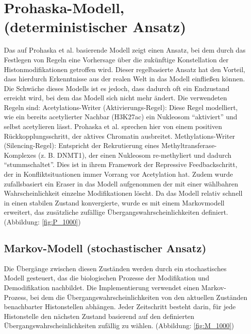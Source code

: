 \documentclass{SeminarV2}
\begin{document}
\section{Prohaska-Modell, (deterministischer Ansatz)}
Das auf Prohaska et al. basierende Modell zeigt einen Ansatz, bei dem durch das Festlegen
von Regeln eine Vorhersage über die zukünftige Konstellation der Histonmodifikationen getroffen wird.
Dieser regelbasierte Ansatz hat den Vorteil, dass hierdurch Erkenntnisse aus der realen Welt in das Modell einfließen können.
Die Schwäche dieses Modells ist es jedoch, dass dadurch oft ein Endzustand erreicht wird, bei dem das Modell sich nicht mehr ändert.
Die verwendeten Regeln sind:
Acetylations-Writer (Aktivierungs-Regel):
Diese Regel modelliert, wie ein bereits acetylierter Nachbar (H3K27ac) ein Nukleosom “aktiviert” und selbst acetylieren lässt. Prohaska et al. sprechen hier von einem positiven Rückkopplungsschritt, der aktives Chromatin ausbreitet.
Methylations-Writer (Silencing-Regel):
Entspricht der Rekrutierung eines Methyltransferase-Komplexes (z. B. DNMT1), der einen Nukleosom re-methyliert und dadurch “stummschaltet”. Dies ist in ihrem Framework der Repressive Feedbackschritt, der in Konfliktsituationen immer Vorrang vor Acetylation hat.
Zudem wurde zufallsbasiert ein Eraser in das Modell aufgenommen der mit einer wählbahren Wahrscheinlichkeit einzelne Modifikationen löscht.
Da das Modell relativ schnell in einen stabilen Zustand konvergierte, wurde es mit einem Markovmodell erweitert, das zusätzliche zufällige Übergangswahrscheinlichkeiten definiert. (Abbildung: \ref{fig:P_1000})

\subsection{Markov-Modell (stochastischer Ansatz)}
Die \"{U}berg\"{a}nge zwischen diesen Zust\"{a}nden 
werden durch ein stochastisches Modell gesteuert, das die 
biologischen Prozesse der Modifikation und Demodifikation nachbildet. 
Die Implementierung verwendet einen Markov-Prozess, bei dem die 
\"{U}bergangswahrscheinlichkeiten von den aktuellen Zust\"{a}nden benachbarter Histonstellen abh\"{a}ngen.
Jeder Zeitschritt besteht darin, für jede Histonstelle den nächsten Zustand basierend auf den definierten Übergangswahrscheinlichkeiten zufällig zu wählen. (Abbildung: \ref{fig:M_1000})
\end{document}
